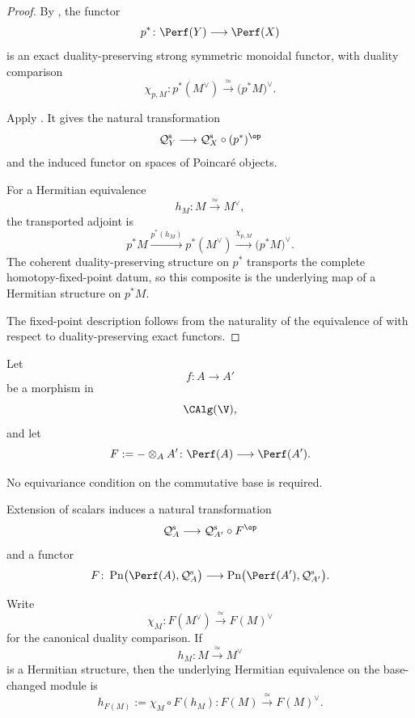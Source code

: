 \begin{proof}
By
,
the functor
\[
    p^*
    \colon
    \Perf(Y)
    \longrightarrow
    \Perf(X)
\]
is an exact duality-preserving strong symmetric monoidal functor, with
duality comparison
\[
    \chi_{p,M}
    \colon
    p^*(M^\vee)
    \xrightarrow{\;\simeq\;}
    \bigl(p^*M\bigr)^\vee.
\]

Apply
.
It gives the natural transformation
\[
    \mathcal Q_Y^{\mathrm s}
    \longrightarrow
    \mathcal Q_X^{\mathrm s}
    \circ
    (p^*)^{\op}
\]
and the induced functor on spaces of Poincaré objects.

For a Hermitian equivalence
\[
    h_M
    \colon
    M
    \xrightarrow{\;\simeq\;}
    M^\vee,
\]
the transported adjoint is
\[
    p^*M
    \xrightarrow{p^*(h_M)}
    p^*(M^\vee)
    \xrightarrow{\chi_{p,M}}
    \bigl(p^*M\bigr)^\vee.
\]
The coherent duality-preserving structure on $p^*$ transports the complete
homotopy-fixed-point datum, so this composite is the underlying map of a
Hermitian structure on $p^*M$.

The fixed-point description follows from the naturality of the
equivalence of
with respect to duality-preserving exact functors.
\end{proof}


\begin{proposition}
\label{prop:base-change-hermitian-perfect-modules}
Let
\[
    f
    \colon
    A
    \longrightarrow
    A'
\]
be a morphism in
\[
    \CAlg(\V),
\]
and let
\[
    F
    :=
    -\otimes_A A'
    \colon
    \Perf(A)
    \longrightarrow
    \Perf(A').
\]

No equivariance condition on the commutative base is required.

Extension of scalars induces a natural transformation
\[
    \mathcal Q_A^{\mathrm s}
    \longrightarrow
    \mathcal Q_{A'}^{\mathrm s}
    \circ
    F^{\op}
\]
and a functor
\[
    F
    \colon
    \operatorname{Pn}
    \bigl(
        \Perf(A),
        \mathcal Q_A^{\mathrm s}
    \bigr)
    \longrightarrow
    \operatorname{Pn}
    \bigl(
        \Perf(A'),
        \mathcal Q_{A'}^{\mathrm s}
    \bigr).
\]

Write
\[
    \chi_M
    \colon
    F(M^\vee)
    \xrightarrow{\;\simeq\;}
    F(M)^\vee
\]
for the canonical duality comparison. If
\[
    h_M
    \colon
    M
    \xrightarrow{\;\simeq\;}
    M^\vee
\]
is a Hermitian structure, then the underlying Hermitian equivalence on
the base-changed module is
\[
    h_{F(M)}
    :=
    \chi_M
    \circ
    F(h_M)
    \colon
    F(M)
    \xrightarrow{\;\simeq\;}
    F(M)^\vee.
\]
\end{proposition}

